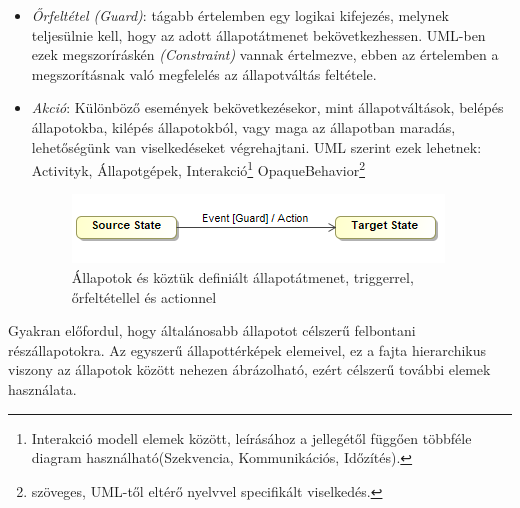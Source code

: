 \begin{itemize}
	\item\label{sec:guard} \emph{Őrfeltétel (Guard)}: tágabb értelemben egy logikai kifejezés, melynek teljesülnie kell, hogy az adott állapotátmenet bekövetkezhessen. UML-ben ezek megszoríráskén \emph{(Constraint)} vannak értelmezve, ebben az értelemben a megszorításnak való megfelelés az állapotváltás feltétele.
	\item \emph{Akció}: Különböző események bekövetkezésekor, mint állapotváltások, belépés állapotokba, kilépés állapotokból, vagy maga az állapotban maradás, lehetőségünk van viselkedéseket végrehajtani. UML szerint ezek lehetnek: Activityk, Állapotgépek, Interakció\footnote{Interakció modell elemek között, leírásához a jellegétől függően többféle diagram használható(Szekvencia, Kommunikációs, Időzítés).} OpaqueBehavior\footnote{ szöveges, UML-től eltérő nyelvvel specifikált viselkedés.}
	
	\begin{figure}[!ht]
		\centering
		\includegraphics[keepaspectratio]{figures/statechart_elements/states.png}
		\caption{Állapotok és köztük definiált állapotátmenet, triggerrel, őrfeltétellel és actionnel}
	\end{figure}
\end{itemize}
Gyakran előfordul, hogy általánosabb állapotot célszerű felbontani részállapotokra. Az egyszerű állapottérképek elemeivel, ez a fajta hierarchikus viszony az állapotok között nehezen ábrázolható, ezért célszerű további elemek használata.
